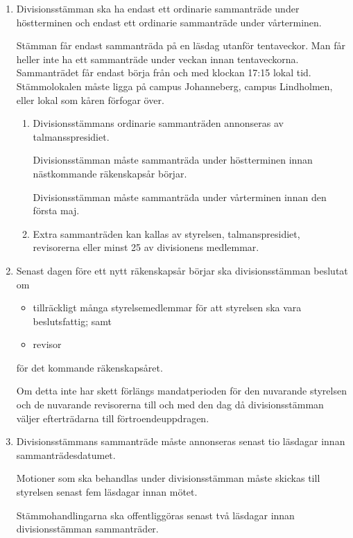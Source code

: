 \documentclass{dvd}
\begin{document}
	\begin{enumerate}[label=\arabic* §, ref=\arabic*]
		\item Divisionsstämman ska ha endast ett ordinarie sammanträde under höstterminen och endast ett ordinarie sammanträde under vårterminen.

		Stämman får endast sammanträda på en läsdag utanför tentaveckor.
		Man får heller inte ha ett sammanträde under veckan innan tentaveckorna.
		Sammanträdet får endast börja från och med klockan 17:15 lokal tid.
		Stämmolokalen måste ligga på campus Johanneberg, campus Lindholmen, eller lokal som kåren förfogar över.

		\begin{enumerate}[label=\theenumi~\alph* §, ref=\theenumi~\alph*]
			\item Divisionsstämmans ordinarie sammanträden annonseras av talmansspresidiet.

			Divisionsstämman måste sammanträda under höstterminen innan nästkommande räkenskapsår börjar.

			Divisionsstämman måste sammanträda under vårterminen innan den första maj.

			\item Extra sammanträden kan kallas av styrelsen, talmanspresidiet, revisorerna eller minst 25 av divisionens medlemmar.
		\end{enumerate}

		\item Senast dagen före ett nytt räkenskapsår börjar ska divisionsstämman beslutat om
		\begin{itemize}
			\item tillräckligt många styrelsemedlemmar för att styrelsen ska vara beslutsfattig; samt
			\item revisor
		\end{itemize}
		för det kommande räkenskapsåret.

		Om detta inte har skett förlängs mandatperioden för den nuvarande styrelsen och de nuvarande revisorerna till och med den dag då divisionsstämman väljer efterträdarna till förtroendeuppdragen.

		\item Divisionsstämmans sammanträde måste annonseras senast tio läsdagar innan sammanträdesdatumet.

		Motioner som ska behandlas under divisionsstämman måste skickas till styrelsen senast fem läsdagar innan mötet.

		Stämmohandlingarna ska offentliggöras senast två läsdagar innan divisionsstämman sammanträder.


\end{enumerate}
\end{document}
